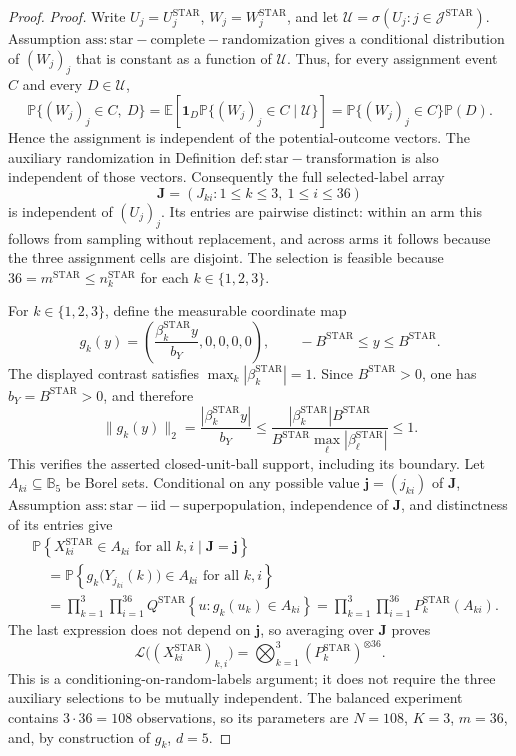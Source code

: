 \documentclass{article}
\begin{document}
\begin{proof}
\emph{Proof.}
Write \(U_j=U_j^{\mathrm{STAR}}\), \(W_j=W_j^{\mathrm{STAR}}\), and let
\(\mathcal U=\sigma(U_j:j\in\mathcal J^{\mathrm{STAR}})\).  Assumption
\(\mathrm{ass:star-complete-randomization}\) gives a conditional distribution of
\((W_j)_j\) that is constant as a function of \(\mathcal U\).  Thus, for every
assignment event \(C\) and every \(D\in\mathcal U\),
\[
 \mathbb P\{(W_j)_j\in C,\ D\}
 =\mathbb E\!\left[\mathbf 1_D
   \mathbb P\{(W_j)_j\in C\mid\mathcal U\}\right]
 =\mathbb P\{(W_j)_j\in C\}\mathbb P(D).
\]
Hence the assignment is independent of the potential-outcome vectors.  The
auxiliary randomization in Definition \(\mathrm{def:star-transformation}\) is
also independent of those vectors.  Consequently the full selected-label
array
\[
 \mathbf J=(J_{ki}:1\leq k\leq3,\ 1\leq i\leq36)
\]
is independent of \((U_j)_j\).  Its entries are pairwise distinct: within an
arm this follows from sampling without replacement, and across arms it follows
because the three assignment cells are disjoint.  The selection is feasible
because \(36=m^{\mathrm{STAR}}\leq n_k^{\mathrm{STAR}}\) for each
\(k\in\{1,2,3\}\).

For \(k\in\{1,2,3\}\), define the measurable coordinate map
\[
 g_k(y)=\left(\frac{\beta_k^{\mathrm{STAR}}y}{b_Y},0,0,0,0\right),
 \qquad -B^{\mathrm{STAR}}\leq y\leq B^{\mathrm{STAR}}.
\]
The displayed contrast satisfies
\(\max_k|\beta_k^{\mathrm{STAR}}|=1\).  Since
\(B^{\mathrm{STAR}}>0\), one has \(b_Y=B^{\mathrm{STAR}}>0\), and therefore
\[
 \|g_k(y)\|_2
 =\frac{|\beta_k^{\mathrm{STAR}}y|}{b_Y}
 \leq\frac{|\beta_k^{\mathrm{STAR}}|B^{\mathrm{STAR}}}
 {B^{\mathrm{STAR}}\max_\ell|\beta_\ell^{\mathrm{STAR}}|}
 \leq1.
\]
This verifies the asserted closed-unit-ball support, including its boundary.
Let \(A_{ki}\subseteq\mathbb B_5\) be Borel sets.  Conditional on any possible
value \(\mathbf j=(j_{ki})\) of \(\mathbf J\), Assumption
\(\mathrm{ass:star-iid-superpopulation}\), independence of \(\mathbf J\), and
distinctness of its entries give
\[
\begin{aligned}
 &\mathbb P\!\left\{X_{ki}^{\mathrm{STAR}}\in A_{ki}
       \text{ for all }k,i\mid\mathbf J=\mathbf j\right\} \\
 &\quad=
 \mathbb P\!\left\{g_k\bigl(Y_{j_{ki}}(k)\bigr)\in A_{ki}
       \text{ for all }k,i\right\} \\
 &\quad=\prod_{k=1}^3\prod_{i=1}^{36}
 Q^{\mathrm{STAR}}\!\left\{u:g_k(u_k)\in A_{ki}\right\}
 =\prod_{k=1}^3\prod_{i=1}^{36}P_k^{\mathrm{STAR}}(A_{ki}).
\end{aligned}
\]
The last expression does not depend on \(\mathbf j\), so averaging over
\(\mathbf J\) proves
\[
 \mathcal L\bigl((X_{ki}^{\mathrm{STAR}})_{k,i}\bigr)
 =\bigotimes_{k=1}^3(P_k^{\mathrm{STAR}})^{\otimes36}.
\]
This is a conditioning-on-random-labels argument; it does not require the
three auxiliary selections to be mutually independent.  The balanced
experiment contains \(3\cdot36=108\) observations, so its parameters are
\(N=108\), \(K=3\), \(m=36\), and, by construction of \(g_k\), \(d=5\).


\end{proof}
\end{document}
